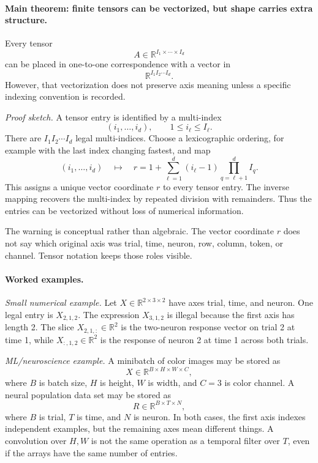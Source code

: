 \paragraph{Main theorem: finite tensors can be vectorized, but shape carries extra structure.}
Every tensor
\[
A\in\mathbb{R}^{I_1\times\cdots\times I_d}
\]
can be placed in one-to-one correspondence with a vector in
\[
\mathbb{R}^{I_1I_2\cdots I_d}.
\]
However, that vectorization does not preserve axis meaning unless a specific indexing convention is recorded.

\emph{Proof sketch.} A tensor entry is identified by a multi-index
\[
(i_1,\ldots,i_d),
\qquad 1\leq i_\ell\leq I_\ell.
\]
There are \(I_1I_2\cdots I_d\) legal multi-indices. Choose a lexicographic ordering, for example with the last index changing fastest, and map
\[
(i_1,\ldots,i_d)
\quad\mapsto\quad
r
=1+\sum_{\ell=1}^d (i_\ell-1)\prod_{q=\ell+1}^d I_q.
\]
This assigns a unique vector coordinate \(r\) to every tensor entry. The inverse mapping recovers the multi-index by repeated division with remainders. Thus the entries can be vectorized without loss of numerical information.

The warning is conceptual rather than algebraic. The vector coordinate \(r\) does not say which original axis was trial, time, neuron, row, column, token, or channel. Tensor notation keeps those roles visible.

\paragraph{Worked examples.}
\emph{Small numerical example.} Let \(X\in\mathbb{R}^{2\times 3\times 2}\) have axes trial, time, and neuron. One legal entry is \(X_{2,1,2}\). The expression \(X_{3,1,2}\) is illegal because the first axis has length 2. The slice \(X_{2,1,:}\in\mathbb{R}^2\) is the two-neuron response vector on trial 2 at time 1, while \(X_{:,1,2}\in\mathbb{R}^2\) is the response of neuron 2 at time 1 across both trials.

\emph{ML/neuroscience example.} A minibatch of color images may be stored as
\[
X\in\mathbb{R}^{B\times H\times W\times C},
\]
where \(B\) is batch size, \(H\) is height, \(W\) is width, and \(C=3\) is color channel. A neural population data set may be stored as
\[
R\in\mathbb{R}^{B\times T\times N},
\]
where \(B\) is trial, \(T\) is time, and \(N\) is neuron. In both cases, the first axis indexes independent examples, but the remaining axes mean different things. A convolution over \(H,W\) is not the same operation as a temporal filter over \(T\), even if the arrays have the same number of entries.

